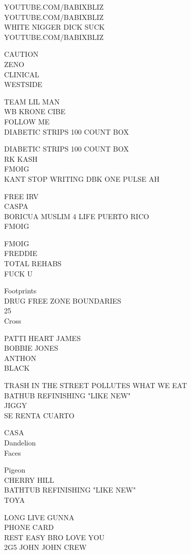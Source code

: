 \documentclass[10pt,letterpaper]{article}
\begin{document}
YOUTUBE.COM/BABIXBLIZ\\
YOUTUBE.COM/BABIXBLIZ\\
WHITE NIGGER DICK SUCK\\
YOUTUBE.COM/BABIXBLIZ

CAUTION\\
ZENO\\
CLINICAL\\
WESTSIDE

TEAM LIL MAN\\
WB KRONE CIBE\\
FOLLOW ME\\
DIABETIC STRIPS 100 COUNT BOX

DIABETIC STRIPS 100 COUNT BOX\\
RK KASH\\
FMOIG\\
KANT STOP WRITING DBK ONE PULSE AH

FREE IRV\\
CASPA\\
BORICUA MUSLIM 4 LIFE PUERTO RICO\\
FMOIG

FMOIG\\
FREDDIE\\
TOTAL REHABS\\
FUCK U

Footprints\\
DRUG FREE ZONE BOUNDARIES\\
25\\
Cross

PATTI HEART JAMES\\
BOBBIE JONES\\
ANTHON\\
BLACK

TRASH IN THE STREET POLLUTES WHAT WE EAT\\
BATHUB REFINISHING "LIKE NEW"\\
JIGGY\\
SE RENTA CUARTO

CASA\\
Dandelion\\
Faces

Pigeon\\
CHERRY HILL\\
BATHTUB REFINISHING "LIKE NEW"\\
TOYA

LONG LIVE GUNNA\\
PHONE CARD\\
REST EASY BRO LOVE YOU\\
2G5 JOHN JOHN CREW
\end{document}

